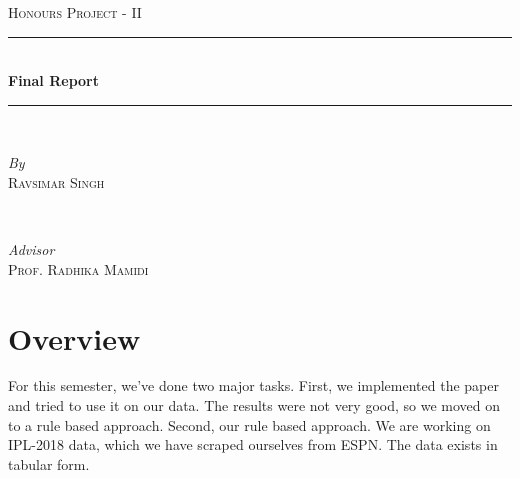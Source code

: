 \documentclass[a4paper]{article}
\begin{document}
\begin{titlepage} %
	\newcommand{\HRule}{\rule{\linewidth}{0.5mm}} %

	\center %
	\textsc{\LARGE Honours Project - II}\\[1.5cm] %

	\vfill


	\HRule\\[0.4cm]

	{\huge\bfseries Final Report}\\[0.4cm] %
	\HRule\\[1.5cm]

	\begin{minipage}{0.4\textwidth}
		\begin{flushleft}
			\large
			\textit{By}\\
			\textsc{Ravsimar Singh} %
		\end{flushleft}
	\end{minipage}
	~
	\begin{minipage}{0.4\textwidth}
		\begin{flushright}
			\large
			\textit{Advisor}\\
			\textsc{Prof. Radhika Mamidi} %
		\end{flushright}
	\end{minipage}

	\vfill\vfill\vfill %


	\vfill %

\end{titlepage}

\section{Overview}\label{sec:overview}
For this semester, we've done two major tasks. First, we implemented the paper \cite{DBLP:journals/corr/VakulenkoS17} and tried to use it on our data. The results were not very good, so we moved on to a rule based approach.
Second, our rule based approach. We are working on IPL-2018 data, which we have scraped ourselves from ESPN. The data exists in tabular form.
\end{document}
